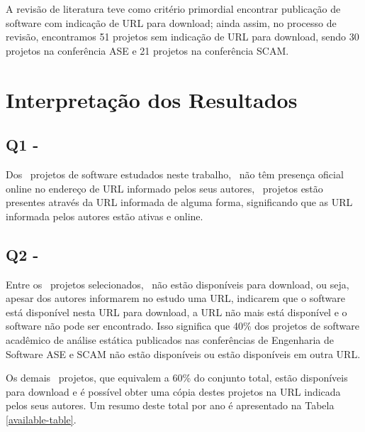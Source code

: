 \begin{description}
A revisão de literatura teve como critério primordial encontrar publicação de
software com indicação de URL para download; ainda assim, no processo de
revisão, encontramos 51 projetos sem indicação de URL para download, sendo 30 projetos
na conferência ASE e 21 projetos na conferência SCAM.

\end{description}


\section{Interpretação dos Resultados} \label{estudo1:interpretacao} %

\subsection{Q1 - \EstudoUmQuestaoUm} %

Dos \SoftwareCount \ projetos de software estudados neste trabalho, \SoftwareUrlNotAvailableCount \ não têm presença
oficial online no endereço de URL informado pelos seus autores, \SoftwareUrlAvailableCount \ projetos
estão presentes através da URL informada de alguma forma, significando que as
URL informada pelos autores estão ativas e online.

\subsection{Q2 - \EstudoUmQuestaoDois} %

Entre os \SoftwareCount \ projetos selecionados, \SoftwareDownloadNotAvailableCount \ não estão disponíveis para download, ou
seja, apesar dos autores informarem no estudo uma URL, indicarem que o software
está disponível nesta URL para download, a URL não mais está disponível e o
software não pode ser encontrado. Isso significa que 40\% dos projetos de software
acadêmico de análise estática publicados nas conferências de Engenharia de
Software ASE e SCAM não estão disponíveis ou estão disponíveis em outra URL.

Os demais \SoftwareDownloadAvailableCount \ projetos, que equivalem a 60\% do conjunto total, estão
disponíveis para download e é possível obter uma cópia destes projetos na URL
indicada pelos seus autores. Um resumo deste total por ano é apresentado na
Tabela \ref{available-table}.



